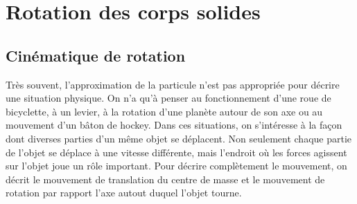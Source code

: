 \chapter{Rotation des corps solides}


\section{Cinématique de rotation}

Très souvent, l'approximation de la particule n'est pas appropriée pour décrire
une situation physique.  On n'a qu'à penser au fonctionnement d'une roue de
bicyclette, à un levier, à la rotation d'une planète autour de son axe ou au
mouvement d'un bâton de hockey.  Dans ces situations, on s'intéresse à la façon
dont diverses parties d'un même objet se déplacent.  Non seulement chaque
partie de l'objet se déplace à une vitesse différente, mais l'endroit où les
forces agissent sur l'objet joue un rôle important.  Pour décrire complètement
le mouvement, on décrit le mouvement de translation du centre de masse et le
mouvement de rotation par rapport l'axe autout duquel l'objet tourne.


